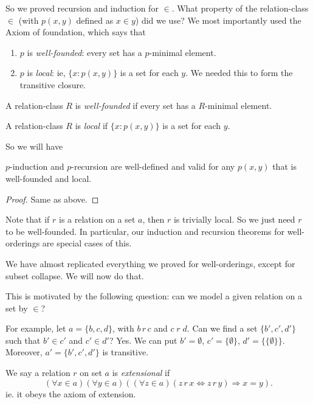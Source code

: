 \documentclass[a4paper]{article}
\begin{document}
So we proved recursion and induction for $\in$. What property of the relation-class $\in$ (with $p(x, y)$ defined as $x\in y$) did we use? We most importantly used the Axiom of foundation, which says that
\begin{enumerate}
  \item $p$ is \emph{well-founded}: every set has a $p$-minimal element.
  \item $p$ is \emph{local}: ie, $\{x: p(x, y)\}$ is a set for each $y$. We needed this to form the transitive closure.
\end{enumerate}

\begin{defi}
  A relation-class $R$ is \emph{well-founded} if every set has a $R$-minimal element.
\end{defi}

\begin{defi}
  A relation-class $R$ is \emph{local} if $\{x: p(x, y)\}$ is a set for each $y$.
\end{defi}

So we will have
\begin{prop}
  $p$-induction and $p$-recursion are well-defined and valid for any $p(x, y)$ that is well-founded and local.
\end{prop}

\begin{proof}
  Same as above.
\end{proof}
Note that if $r$ is a relation on a set $a$, then $r$ is trivially local. So we just need $r$ to be well-founded. In particular, our induction and recursion theorems for well-orderings are special cases of this.

We have almost replicated everything we proved for well-orderings, except for subset collapse. We will now do that.

This is motivated by the following question: can we model a given relation on a set by $\in$?

For example, let $a = \{b, c, d\}$, with $b\,r\,c$ and $c\;r\;d$. Can we find a set $\{b', c', d'\}$ such that $b'\in c'$ and $c'\in d'$? Yes. We can put $b' = \emptyset$, $c' = \{\emptyset\}$, $d' = \{\{\emptyset\}\}$. Moreover, $a' = \{b', c', d'\}$ is transitive.

\begin{defi}
  We say a relation $r$ on set $a$ is \emph{extensional} if
  \[
    (\forall x\in a)(\forall y\in a)((\forall z\in a)(z\,r\,x \Leftrightarrow z\,r\,y)\Rightarrow x = y).
  \]
  ie. it obeys the axiom of extension.
\end{defi}
\end{document}
